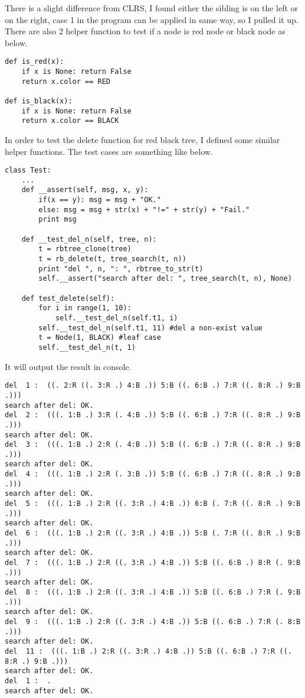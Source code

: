 \documentclass{article}
\begin{document}
There is a slight difference from CLRS, I found either the sibling is on the left or on
the right, case 1 in the program can be applied in same way, so I pulled it up. There are
also 2 helper function to test if a node is red node or black node as below.

\begin{lstlisting}
def is_red(x):
    if x is None: return False
    return x.color == RED

def is_black(x):
    if x is None: return False
    return x.color == BLACK
\end{lstlisting}

In order to test the delete function for red black tree, I defined some similar helper
functions. The test cases are something like below.

\begin{lstlisting}
class Test:
    ...
    def __assert(self, msg, x, y):
        if(x == y): msg = msg + "OK."
        else: msg = msg + str(x) + "!=" + str(y) + "Fail."
        print msg

    def __test_del_n(self, tree, n):
        t = rbtree_clone(tree)
        t = rb_delete(t, tree_search(t, n))
        print "del ", n, ": ", rbtree_to_str(t)
        self.__assert("search after del: ", tree_search(t, n), None)

    def test_delete(self):
        for i in range(1, 10):
            self.__test_del_n(self.t1, i)
        self.__test_del_n(self.t1, 11) #del a non-exist value
        t = Node(1, BLACK) #leaf case
        self.__test_del_n(t, 1)
\end{lstlisting}

It will output the result in console.

\begin{verbatim}
del  1 :  ((. 2:R ((. 3:R .) 4:B .)) 5:B ((. 6:B .) 7:R ((. 8:R .) 9:B .)))
search after del: OK.
del  2 :  (((. 1:B .) 3:R (. 4:B .)) 5:B ((. 6:B .) 7:R ((. 8:R .) 9:B .)))
search after del: OK.
del  3 :  (((. 1:B .) 2:R (. 4:B .)) 5:B ((. 6:B .) 7:R ((. 8:R .) 9:B .)))
search after del: OK.
del  4 :  (((. 1:B .) 2:R (. 3:B .)) 5:B ((. 6:B .) 7:R ((. 8:R .) 9:B .)))
search after del: OK.
del  5 :  (((. 1:B .) 2:R ((. 3:R .) 4:B .)) 6:B (. 7:R ((. 8:R .) 9:B .)))
search after del: OK.
del  6 :  (((. 1:B .) 2:R ((. 3:R .) 4:B .)) 5:B (. 7:R ((. 8:R .) 9:B .)))
search after del: OK.
del  7 :  (((. 1:B .) 2:R ((. 3:R .) 4:B .)) 5:B ((. 6:B .) 8:R (. 9:B .)))
search after del: OK.
del  8 :  (((. 1:B .) 2:R ((. 3:R .) 4:B .)) 5:B ((. 6:B .) 7:R (. 9:B .)))
search after del: OK.
del  9 :  (((. 1:B .) 2:R ((. 3:R .) 4:B .)) 5:B ((. 6:B .) 7:R (. 8:B .)))
search after del: OK.
del  11 :  (((. 1:B .) 2:R ((. 3:R .) 4:B .)) 5:B ((. 6:B .) 7:R ((. 8:R .) 9:B .)))
search after del: OK.
del  1 :  .
search after del: OK.
\end{verbatim}
\end{document}
